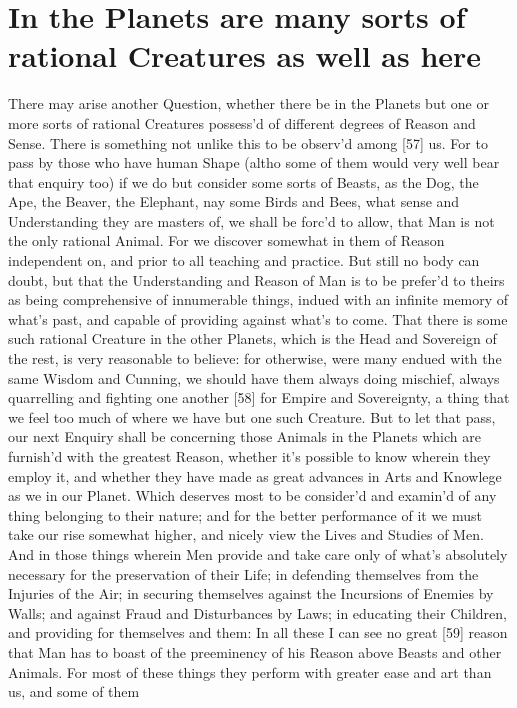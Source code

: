 \documentclass[letterpaper]{book}
\begin{document}
\section{In the Planets are many sorts of rational Creatures as well as here}

There may arise another Question, whether there be in the Planets but one or
more sorts of rational Creatures possess'd of different degrees of Reason
and Sense. There is something not unlike this to be observ'd among [57] us.
For to pass by those who have human Shape (altho some of them would very
well bear that enquiry too) if we do but consider some sorts of Beasts, as
the Dog, the Ape, the Beaver, the Elephant, nay some Birds and Bees, what
sense and Understanding they are masters of, we shall be forc'd to allow,
that Man is not the only rational Animal. For we discover somewhat in them
of Reason independent on, and prior to all teaching and practice.  But still
no body can doubt, but that the Understanding and Reason of Man is to be
prefer'd to theirs as being comprehensive of innumerable things, indued with
an infinite memory of what's past, and capable of providing against what's
to come. That there is some such rational Creature in the other Planets,
which is the Head and Sovereign of the rest, is very reasonable to believe:
for otherwise, were many endued with the same Wisdom and Cunning, we should
have them always doing mischief, always quarrelling and fighting one another
[58] for Empire and Sovereignty, a thing that we feel too much of where we
have but one such Creature. But to let that pass, our next Enquiry shall be
concerning those Animals in the Planets which are furnish'd with the
greatest Reason, whether it's possible to know wherein they employ it, and
whether they have made as great advances in Arts and Knowlege as we in our
Planet. Which deserves most to be consider'd and examin'd of any thing
belonging to their nature; and for the better performance of it we must take
our rise somewhat higher, and nicely view the Lives and Studies of Men.  And
in those things wherein Men provide and take care only of what's absolutely
necessary for the preservation of their Life; in defending
themselves from the Injuries of the Air; in securing themselves against the
Incursions of Enemies by Walls; and against Fraud and Disturbances by Laws;
in educating their Children, and providing for themselves and them: In all
these I can see no great [59] reason that Man has to boast of the
preeminency of his Reason above Beasts and other Animals. For most of these
things they perform with greater ease and art than us, and some of them
\end{document}
